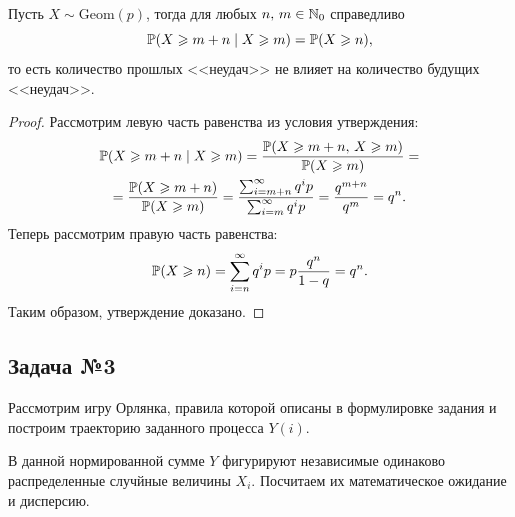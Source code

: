 \begin{assertion}
        Пусть $X\sim\mbox{Geom}(p)$, тогда для любых $n,\,m\in\mathbb{N}_0$ справедливо
        $$
                \mathbb{P}(X \geqslant m + n\;|\;X\geqslant m) = \mathbb{P}(X\geqslant n),
        $$
        то есть количество прошлых <<неудач>> не влияет на количество будущих <<неудач>>.
\end{assertion}
\begin{proof}
        Рассмотрим левую часть равенства из условия утверждения:
        \begin{multline*}
                \mathbb{P}(X \geqslant m+n\;|\;X\geqslant m)=
                \frac{\mathbb{P}(X\geqslant m + n,\,X\geqslant m)}{\mathbb{P}(X\geqslant m)}=\\
                =\frac{\mathbb{P}(X\geqslant m+ n)}{\mathbb{P}(X\geqslant m)}=
                \frac{\sum_{i=m+n}^{\infty}q^ip}{\sum_{i=m}^{\infty}q^ip}=
                \frac{q^{m+n}}{q^m}=
                q^n.
        \end{multline*}
        Теперь рассмотрим правую часть равенства:
        $$
                \mathbb{P}(X\geqslant n) = \sum_{i=n}^{\infty}q^ip =
                p\frac{q^n}{1 - q} = q^n.
        $$
        Таким образом, утверждение доказано.
\end{proof}

\subsection{Задача №3}

Рассмотрим игру Орлянка, правила которой описаны в формулировке задания и построим траекторию заданного процесса $Y(i)$.


В данной нормированной сумме $Y$ фигурируют независимые одинаково распределенные случйные величины $X_i$.
Посчитаем их математическое ожидание и дисперсию.

